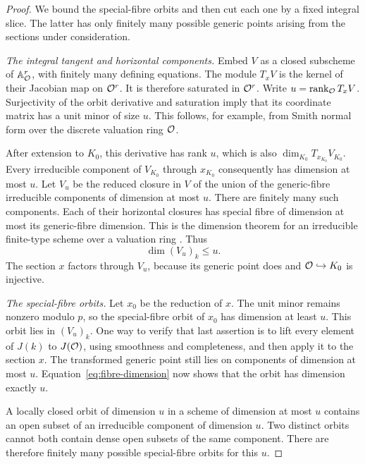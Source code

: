 \begin{proof}
We bound the special-fibre orbits and then cut each one by a fixed
integral slice.  The latter has only finitely many possible generic
points arising from the sections under consideration.

\emph{The integral tangent and horizontal components.}
Embed $V$ as a closed subscheme of $\mathbb A^r_{\mathcal O}$, with
finitely many defining equations.  The module $T_xV$ is the kernel
of their Jacobian map on $\mathcal O^r$.  It is therefore saturated in
$\mathcal O^r$.  Write $u=\operatorname{rank}_{\mathcal O}T_xV$.  Surjectivity of the orbit
derivative and saturation imply that its coordinate matrix has a
unit minor of size $u$.  This follows, for example, from Smith
normal form over the discrete valuation ring $\mathcal O$.

After extension to $K_0$, this derivative has rank $u$, which is
also $\dim_{K_0}T_{x_{K_0}}V_{K_0}$.  Every irreducible component
of $V_{K_0}$ through $x_{K_0}$ consequently has dimension at most
$u$.  Let $V_u$ be the reduced closure in $V$ of the union of the
generic-fibre irreducible components of dimension at most $u$.
There are finitely many such components.  Each of their horizontal
closures has special fibre of dimension at most its generic-fibre
dimension.  This is the dimension theorem for an irreducible
finite-type scheme over a valuation ring
\cite[Lemma~33.19.2, Tag~0B2J]{StacksProject}.  Thus
\begin{equation}\label{eq:fibre-dimension}
 \dim (V_u)_k\leq u.
\end{equation}
The section $x$ factors through $V_u$, because its generic point
does and $\mathcal O\hookrightarrow K_0$ is injective.

\emph{The special-fibre orbits.}
Let $x_0$ be the reduction of $x$.  The unit minor remains nonzero
modulo $p$, so the special-fibre orbit of $x_0$ has dimension at
least $u$.  This orbit lies in $(V_u)_k$.  One way to verify that
last assertion is to lift every element of $J(k)$ to $J(\mathcal O)$,
using smoothness and completeness, and then apply it to the section
$x$.  The transformed generic point still lies on components of
dimension at most $u$.  Equation~\eqref{eq:fibre-dimension} now
shows that the orbit has dimension exactly $u$.

A locally closed orbit of dimension $u$ in a scheme of dimension
at most $u$ contains an open subset of an irreducible component of
dimension $u$.  Two distinct orbits cannot both contain dense open
subsets of the same component.  There are therefore finitely many
possible special-fibre orbits for this $u$.


\end{proof}
